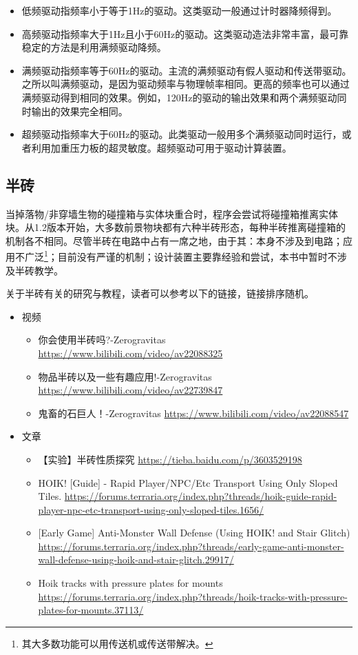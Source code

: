 \begin{itemize}
\item 低频驱动指频率小于等于1Hz的驱动。这类驱动一般通过计时器降频得到。
\item 高频驱动指频率大于1Hz且小于60Hz的驱动。这类驱动造法非常丰富，最可靠稳定的方法是利用满频驱动降频。
\item 满频驱动指频率等于60Hz的驱动。主流的满频驱动有假人驱动和传送带驱动。之所以叫满频驱动，是因为驱动频率与物理帧率相同。更高的频率也可以通过满频驱动得到相同的效果。例如，120Hz的驱动的输出效果和两个满频驱动同时输出的效果完全相同。
\item 超频驱动指频率大于60Hz的驱动。此类驱动一般用多个满频驱动同时运行，或者利用加重压力板的超灵敏度。超频驱动可用于驱动计算装置。
\end{itemize}

\subsection{半砖}

当掉落物/非穿墙生物的碰撞箱与实体块重合时，程序会尝试将碰撞箱推离实体块。从1.2版本开始，大多数前景物块都有六种半砖形态，每种半砖推离碰撞箱的机制各不相同。尽管半砖在电路中占有一席之地，由于其：本身不涉及到电路；应用不广泛\footnote{其大多数功能可以用传送机或传送带解决。}；目前没有严谨的机制；设计装置主要靠经验和尝试，本书中暂时不涉及半砖教学。

关于半砖有关的研究与教程，读者可以参考以下的链接，链接排序随机。

\begin{itemize}
\item 视频
\begin{itemize}
\item 你会使用半砖吗?-Zerogravitas \url{https://www.bilibili.com/video/av22088325}
\item 物品半砖以及一些有趣应用!-Zerogravitas \url{https://www.bilibili.com/video/av22739847}
\item 鬼畜的石巨人！-Zerogravitas \url{https://www.bilibili.com/video/av22088547}
\end{itemize}
\item 文章
\begin{itemize}
\item 【实验】半砖性质探究 \url{https://tieba.baidu.com/p/3603529198}
\item HOIK! [Guide] - Rapid Player/NPC/Etc Transport Using Only Sloped Tiles. \url{https://forums.terraria.org/index.php?threads/hoik-guide-rapid-player-npc-etc-transport-using-only-sloped-tiles.1656/}
\item {[}Early Game] Anti-Monster Wall Defense (Using HOIK! and Stair Glitch) \url{https://forums.terraria.org/index.php?threads/early-game-anti-monster-wall-defense-using-hoik-and-stair-glitch.29917/}
\item Hoik tracks with pressure plates for mounts \url{https://forums.terraria.org/index.php?threads/hoik-tracks-with-pressure-plates-for-mounts.37113/}
\end{itemize}
\end{itemize}

